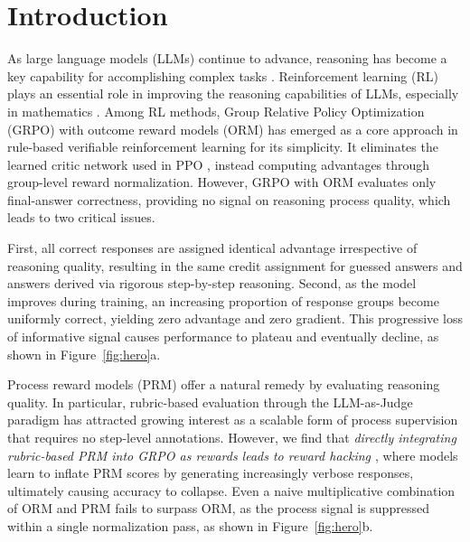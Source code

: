 \section{Introduction}
\label{sec:intro}

As large language models (LLMs) \citep{yang2024qwen2,gemmateam2025gemma3technicalreport,touvron2023llamaopenefficientfoundation} continue to advance, reasoning has become a key capability for accomplishing complex tasks \citep{guo2025deepseek}. Reinforcement learning (RL) plays an essential role in improving the reasoning capabilities of LLMs, especially in mathematics \citep{shao2024deepseekmath,deepseek-math-v2}. Among RL methods, Group Relative Policy Optimization (GRPO) \citep{shao2024deepseekmath} with outcome reward models (ORM) has emerged as a core approach in rule-based verifiable reinforcement learning for its simplicity. It eliminates the learned critic network used in PPO \citep{schulman2017proximal}, instead computing advantages through group-level reward normalization. However, GRPO with ORM evaluates only final-answer correctness, providing no signal on reasoning process quality, which leads to two critical issues.

First, all correct responses are assigned identical advantage irrespective of reasoning quality, resulting in the same credit assignment for guessed answers and answers derived via rigorous step-by-step reasoning. Second, as the model improves during training, an increasing proportion of response groups become uniformly correct, yielding zero advantage and zero gradient. This progressive loss of informative signal causes performance to plateau and eventually decline, as shown in Figure~\ref{fig:hero}a.

Process reward models (PRM) \citep{zheng2023judgingllmasajudgemtbenchchatbot,lightman2023lets, wang2024math} offer a natural remedy by evaluating reasoning quality. In particular, rubric-based evaluation \citep{yuan2025miraclesteps,deepseek-math-v2,Sheng2026ReinforcingCR,Yang2026} through the LLM-as-Judge paradigm has attracted growing interest as a scalable form of process supervision that requires no step-level annotations. However, we find that \emph{directly integrating rubric-based PRM into GRPO as rewards leads to reward hacking \citep{skalse2022defining}}, where models learn to inflate PRM scores by generating increasingly verbose responses, ultimately causing accuracy to collapse. Even a naive multiplicative combination of ORM and PRM fails to surpass ORM, as the process signal is suppressed within a single normalization pass, as shown in Figure~\ref{fig:hero}b.

